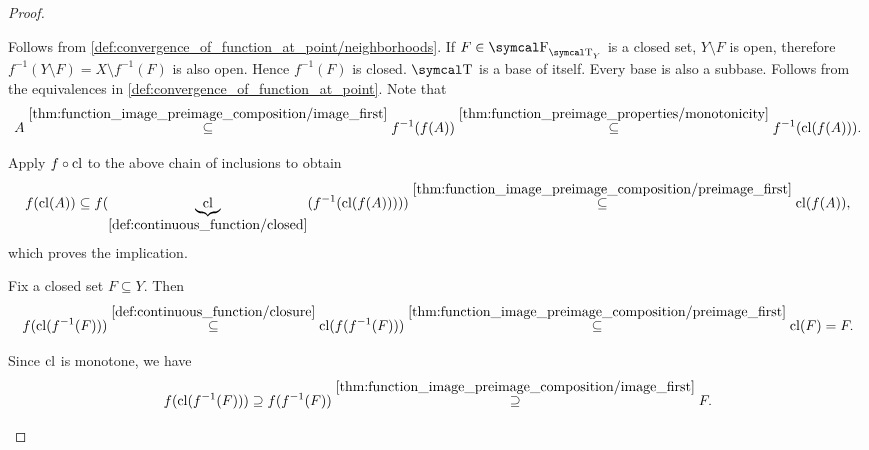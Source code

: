 \begin{proof}
  \begin{description}
     Follows from \cref{def:convergence_of_function_at_point/neighborhoods}.
     If \( F \in \CF_{\CT_Y} \) is a closed set, \( Y \setminus F \) is open, therefore \( f^{-1}(Y \setminus F) = X \setminus f^{-1}(F) \) is also open. Hence \( f^{-1}(F) \) is closed.
     \( \CT \) is a base of itself.
     Every base is also a subbase.
     Follows from the equivalences in \cref{def:convergence_of_function_at_point}.
     Note that
    \begin{equation*}
      A
      \overset {\ref{thm:function_image_preimage_composition/image_first}} \subseteq
      f^{-1}(f(A))
      \overset {\ref{thm:function_preimage_properties/monotonicity}} \subseteq
      f^{-1}(\operatorname{cl}(f(A))).
    \end{equation*}

    Apply \( f \circ \operatorname{cl} \) to the above chain of inclusions to obtain
    \begin{equation*}
      f(\operatorname{cl}(A))
      \subseteq
      f(\underbrace{\operatorname{cl}}_{\ref{def:continuous_function/closed}}(f^{-1}(\operatorname{cl}(f(A)))))
      \overset {\ref{thm:function_image_preimage_composition/preimage_first}} \subseteq
      \operatorname{cl}(f(A)),
    \end{equation*}
    which proves the implication.

     Fix a closed set \( F \subseteq Y \). Then
    \begin{equation}\label{def:continuous_function/closure_implies_closed_right}
      f(\operatorname{cl}(f^{-1}(F)))
      \overset {\ref{def:continuous_function/closure}} \subseteq
      \operatorname{cl}(f(f^{-1}(F)))
      \overset {\ref{thm:function_image_preimage_composition/preimage_first}} \subseteq
      \operatorname{cl}(F)
      =
      F.
    \end{equation}

    Since \( \operatorname{cl} \) is monotone, we have
    \begin{equation}\label{def:continuous_function/closure_implies_closed_left}
      f(\operatorname{cl}(f^{-1}(F)))
      \supseteq
      f(f^{-1}(F))
      \overset {\ref{thm:function_image_preimage_composition/image_first}} \supseteq
      F.
    \end{equation}


\end{description}
\end{proof}
